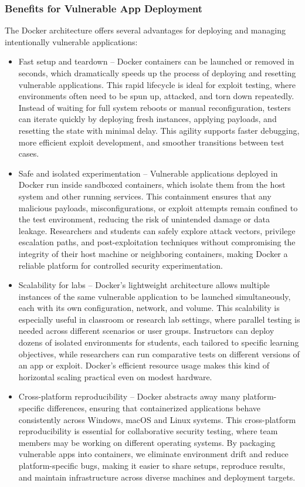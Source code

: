 \documentclass[12pt,titlepage]{article}
\begin{document}
\subsubsection{Benefits for Vulnerable App Deployment}
The Docker architecture offers several advantages for deploying and managing intentionally vulnerable applications:
  \begin{itemize}
    \item {Fast setup and teardown} – Docker containers can be launched or removed in seconds, which dramatically speeds up the process of deploying and resetting vulnerable applications. This rapid lifecycle is ideal for exploit testing, where environments often need to be spun up, attacked, and torn down repeatedly. Instead of waiting for full system reboots or manual reconfiguration, testers can iterate quickly by deploying fresh instances, applying payloads, and resetting the state with minimal delay. This agility supports faster debugging, more efficient exploit development, and smoother transitions between test cases.
    \item {Safe and isolated experimentation} – Vulnerable applications deployed in Docker run inside sandboxed containers, which isolate them from the host system and other running services. This containment ensures that any malicious payloads, misconfigurations, or exploit attempts remain confined to the test environment, reducing the risk of unintended damage or data leakage. Researchers and students can safely explore attack vectors, privilege escalation paths, and post-exploitation techniques without compromising the integrity of their host machine or neighboring containers, making Docker a reliable platform for controlled security experimentation.
	\item {Scalability for labs} – Docker’s lightweight architecture allows multiple instances of the same vulnerable application to be launched simultaneously, each with its own configuration, network, and volume. This scalability is especially useful in classroom or research lab settings, where parallel testing is needed across different scenarios or user groups. Instructors can deploy dozens of isolated environments for students, each tailored to specific learning objectives, while researchers can run comparative tests on different versions of an app or exploit. Docker’s efficient resource usage makes this kind of horizontal scaling practical even on modest hardware.
    \item {Cross-platform reproducibility} – Docker abstracts away many platform-specific differences, ensuring that containerized applications behave consistently across Windows, macOS and Linux systems. This cross-platform reproducibility is essential for collaborative security testing, where team members may be working on different operating systems. By packaging vulnerable apps into containers, we eliminate environment drift and reduce platform-specific bugs, making it easier to share setups, reproduce results, and maintain infrastructure across diverse machines and deployment targets.

\end{itemize}
\end{document}
